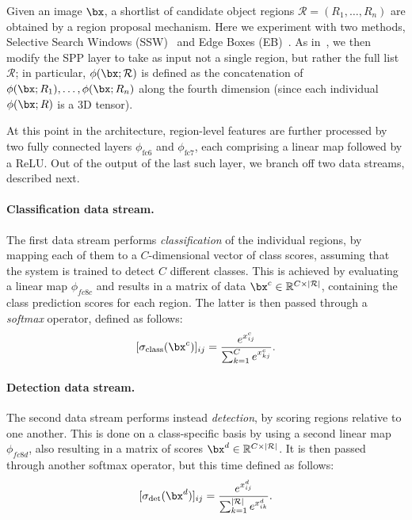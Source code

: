 Given an image $\bx$, a shortlist of candidate object regions $\mathcal{R} = (R_1,\dots,R_n)$ are obtained by a region proposal mechanism. Here we experiment with two methods, Selective Search Windows (SSW)~\cite{Sande11} and Edge Boxes (EB)~\cite{Zitnick14}. As in~\cite{Girshick15}, we then modify the SPP layer to take as input not a single region, but rather the full list $\mathcal{R}$; in particular, $\phi(\bx;\mathcal{R})$ is defined as the concatenation of $\phi(\bx;R_1), \dots, \phi(\bx;R_n)$ along the fourth dimension (since each individual $\phi(\bx;R)$ is a 3D tensor).

At this point in the architecture, region-level features are further processed by two fully connected layers $\phi_\text{fc6}$ and $\phi_\text{fc7}$, each comprising a linear map followed by a ReLU. Out of the output of the last such layer, we branch off two data streams, described next.

\paragraph{Classification data stream.} The first data stream performs \emph{classification} of the individual regions, by mapping each of them to a $C$-dimensional vector of class scores, assuming that the system is trained to detect $C$ different classes. This is achieved by evaluating a linear map $\phi_{fc8c}$ and results in a matrix of data $\bx^c \in \mathbb{R}^{C \times |\mathcal{R}|}$, containing the class prediction scores for each region. The latter is then passed through a \emph{softmax} operator, defined as follows:
\begin{equation}\label{e:softmaxc}
  [\sigma_\text{class}(\bx^c)]_{ij}
  = 
  \frac{e^{x^c_{ij}}}{\sum_{k=1}^{C} e^{x^c_{kj}}}.
\end{equation}

\paragraph{Detection data stream.} The second data stream performs instead \emph{detection}, by scoring regions relative to one another. This is done on a class-specific basis by using a second linear map $\phi_{fc8d}$, also resulting in a matrix of scores $\bx^d \in \mathbb{R}^{C \times |\mathcal{R}|}$. It is then passed through another softmax operator, but this time defined as follows:
\begin{equation}\label{e:softmaxd}
  [\sigma_\text{det}(\bx^d)]_{ij}
  = 
  \frac{e^{x^d_{ij}}}{\sum_{k=1}^{|\mathcal{R}|} e^{x^d_{ik}}}.
\end{equation}

